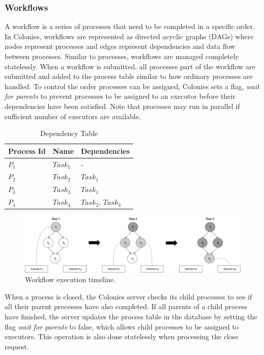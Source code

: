 \documentclass{article}
\begin{document}
\subsubsection{Workflows}
A workflow is a series of processes that need to be completed in a specific order. In Colonies, workflows are represented as directed acyclic graphs (DAGs) where nodes represent processes and edges represent dependencies and data flow between processes. Similar to processes, workflows are managed completely statelessly. When a workflow is submitted, all processes part of the workflow are submitted and added to the process table similar to how ordinary processes are handled. To control the order processes can be assigned, Colonies sets a flag, \emph{wait for parents} to prevent processes to be assigned to an executor before their dependencies have been satisfied. Note that processes may run in parallel if sufficient number of executors are available.

\begin{table}[h]
	\caption{Dependency Table}
	\centering
	\begin{tabular}{lll}
		\toprule
		\cmidrule(r){1-2}
        Process Id & Name       & Dependencies           \\
		\midrule
        $P_{1}$    & $Task_{1}$ & -                      \\
        $P_{2}$    & $Task_{2}$ & $Task_{1}$             \\
        $P_{3}$    & $Task_{3}$ & $Task_{1}$             \\
        $P_{4}$    & $Task_{4}$ & $Task_{2}$, $Task_{3}$ \\
		\bottomrule
	\end{tabular}
	\label{deptable}
\end{table}

\begin{figure}[h]
	\centering
    \includegraphics[scale=0.30]{workflow.png}
	\caption{Workflow execution timeline.}
	\label{fig:workflowexec}
\end{figure}

When a process is closed, the Colonies server checks its child processes to see if all their parent processes have also completed. If all parents of a child process have finished, the server updates the process table in the database by setting the flag \emph{wait for parents} to false, which allows child processes to be assigned to executors. This operation is also done statelessly when processing the close request. 
\end{document}
